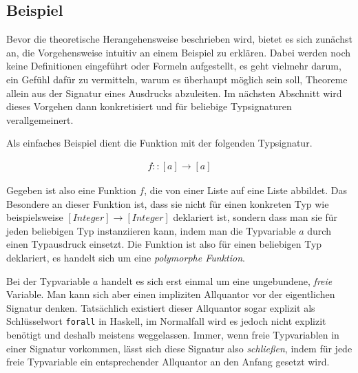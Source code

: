 \subsection{Beispiel}

Bevor die theoretische Herangehensweise beschrieben wird, bietet es sich zunächst an, die Vorgehensweise intuitiv an einem
Beispiel zu erklären. Dabei werden noch keine Definitionen eingeführt oder Formeln aufgestellt, es geht vielmehr darum,
ein Gefühl dafür zu vermitteln, warum es überhaupt möglich sein soll, Theoreme allein aus der Signatur eines Ausdrucks
abzuleiten. Im nächsten Abschnitt wird dieses Vorgehen dann konkretisiert und für beliebige Typsignaturen verallgemeinert.

Als einfaches Beispiel dient die Funktion mit der folgenden Typsignatur.


\begin{align}
f :: [a] \rightarrow [a] \label{eq:fsig}
\end{align}

Gegeben ist also eine Funktion $f$, die von einer Liste auf eine Liste abbildet. Das Besondere an dieser Funktion ist, dass sie
nicht für einen konkreten Typ wie beispielsweise $[Integer] \rightarrow [Integer]$ deklariert ist, sondern dass man sie für jeden
beliebigen Typ instanziieren kann, indem man die Typvariable $a$ durch einen Typausdruck einsetzt. Die Funktion ist also für
einen beliebigen Typ deklariert, es handelt sich um eine \textit{polymorphe Funktion}.

Bei der Typvariable $a$ handelt es sich erst einmal um eine ungebundene, \textit{freie} Variable. Man kann sich aber einen impliziten
Allquantor vor der eigentlichen Signatur denken. Tatsächlich existiert dieser Allquantor sogar explizit als Schlüsselwort \texttt{forall} in Haskell,
im Normalfall wird es jedoch nicht explizit benötigt und deshalb meistens weggelassen. Immer, wenn
freie Typvariablen in einer Signatur vorkommen, lässt sich diese Signatur also \textit{schließen}, indem für jede freie Typvariable
ein entsprechender Allquantor an den Anfang gesetzt wird.


